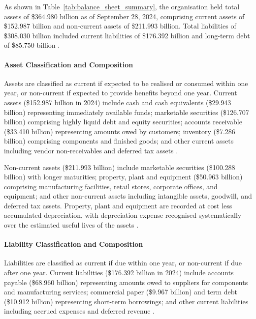 \documentclass[12pt,a4paper]{article}
\begin{document}
As shown in Table~\ref{tab:balance_sheet_summary}, the organisation held total assets of \$364.980 billion as of September 28, 2024, comprising current assets of \$152.987 billion and non-current assets of \$211.993 billion. Total liabilities of \$308.030 billion included current liabilities of \$176.392 billion and long-term debt of \$85.750 billion \citep{apple202410k}.

\paragraph{Asset Classification and Composition}

Assets are classified as current if expected to be realised or consumed within one year, or non-current if expected to provide benefits beyond one year. Current assets (\$152.987 billion in 2024) include cash and cash equivalents (\$29.943 billion) representing immediately available funds; marketable securities (\$126.707 billion) comprising highly liquid debt and equity securities; accounts receivable (\$33.410 billion) representing amounts owed by customers; inventory (\$7.286 billion) comprising components and finished goods; and other current assets including vendor non-receivables and deferred tax assets \citep{apple202410k}.

Non-current assets (\$211.993 billion) include marketable securities (\$100.288 billion) with longer maturities; property, plant and equipment (\$50.963 billion) comprising manufacturing facilities, retail stores, corporate offices, and equipment; and other non-current assets including intangible assets, goodwill, and deferred tax assets. Property, plant and equipment are recorded at cost less accumulated depreciation, with depreciation expense recognised systematically over the estimated useful lives of the assets \citep{kieso2023}.

\paragraph{Liability Classification and Composition}

Liabilities are classified as current if due within one year, or non-current if due after one year. Current liabilities (\$176.392 billion in 2024) include accounts payable (\$68.960 billion) representing amounts owed to suppliers for components and manufacturing services; commercial paper (\$9.967 billion) and term debt (\$10.912 billion) representing short-term borrowings; and other current liabilities including accrued expenses and deferred revenue \citep{apple202410k}.
\end{document}
